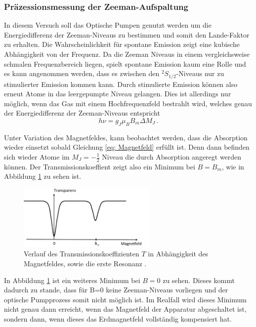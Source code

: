 \subsubsection*{Präzessionsmessung der Zeeman-Aufspaltung}
In diesem Versuch soll das Optische Pumpen genutzt werden um die Energiedifferenz der Zeeman-Niveaus zu bestimmen und somit den Lande-Faktor zu erhalten.
Die Wahrscheinlichkeit für spontane Emission zeigt eine kubische Abhängigkeit von der Frequenz.
Da die Zeeman Niveaus in einem vergleichsweise schmalen Frequenzbereich liegen, spielt spontane Emission kaum eine Rolle und es kann angenommen werden, dass es zwischen den $^2S_{1/2}$-Niveaus nur zu stimulierter Emission kommen kann.
Durch stimulierte Emission können also erneut Atome in das leergepumpte Niveau gelangen. 
Dies ist allerdings nur möglich, wenn das Gas mit einem Hochfrequenzfeld bestrahlt wird, welches genau der Energiedifferenz der Zeeman-Niveaus entspricht
\begin{equation}\label{eq: Magnetfeld}
h\nu = g_J \mu_B B_m \Delta M_J \, .
\end{equation}

Unter Variation des Magnetfeldes, kann beobachtet werden, dass die Absorption wieder einsetzt sobald Gleichung \eqref{eq: Magnetfeld} erfüllt ist.
Denn dann befinden sich wieder Atome im $M_J= -\frac{1}{2}$ Niveau die durch Absorption angeregt werden können.
Der Transmissionskoeffient zeigt also ein Minimum bei $B=B_m$, wie in Abbildung \ref{fig:tfig6} zu sehen ist.
\FloatBarrier
\begin{figure}[h]
    \centering
    \includegraphics[width=0.6\textwidth]{transmission2.png}
    \caption{Verlauf des Transmissionskoeffizienten $T$ in Abhängigkeit des Magnetfeldes, sowie die erste Resonanz \cite{quelle01}.}
    \label{fig:tfig6}
\end{figure}
\FloatBarrier
\noindent

In Abbildung \ref{fig:tfig6} ist ein weiteres Minimum bei $B=0$ zu sehen.
Dieses kommt dadurch zu stande, dass für B=0 keine Zeeman-Niveaus vorliegen und der optische Pumpprozess somit nicht möglich ist.
Im Realfall wird dieses Minimum nicht genau dann erreicht, wenn das Magnetfeld der Apparatur abgeschaltet ist, sondern dann, wenn dieses das Erdmagnetfeld vollständig kompensiert hat.

